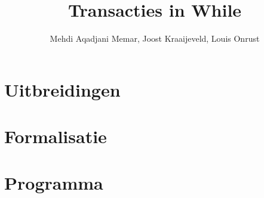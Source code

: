 \documentclass[twoside,fleqn]{artikel3}
\title{Transacties in While}
\author{Mehdi Aqadjani Memar, Joost Kraaijeveld, Louis Onrust}
\begin{document}



\part{Uitbreidingen}

\newpage



\part{Formalisatie}



\part{Programma}






%
\end{document}
